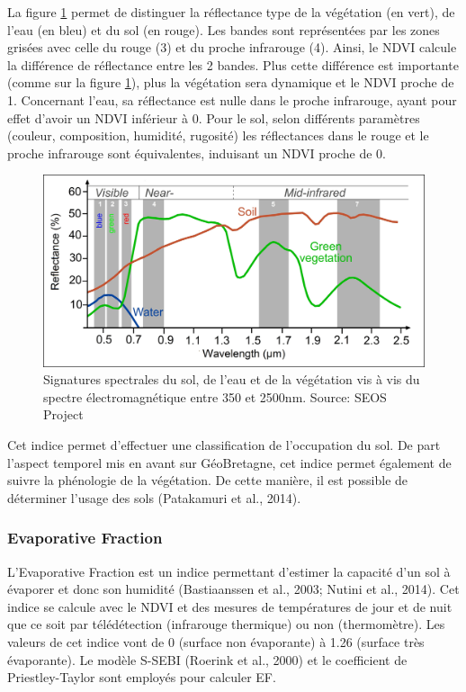 \documentclass[10pt,a4paper]{article}
\begin{document}
La figure \ref{signSpectr} permet de distinguer la réflectance type de la végétation (en vert), de l'eau (en bleu) et du sol (en rouge). Les bandes sont représentées par les zones grisées avec celle du rouge (3) et du proche infrarouge (4). Ainsi, le NDVI calcule la différence de réflectance entre les 2 bandes. Plus cette différence est importante (comme sur la figure \ref{signSpectr}), plus la végétation sera dynamique et le NDVI proche de 1. Concernant l'eau, sa réflectance est nulle dans le proche infrarouge, ayant pour effet d'avoir un NDVI inférieur à 0. Pour le sol, selon différents paramètres (couleur, composition, humidité, rugosité) les réflectances dans le rouge et le proche infrarouge sont équivalentes, induisant un NDVI proche de 0.\smallbreak

\begin{figure}[!h]
\centering
\includegraphics[scale=0.4]{img/spectral_signatures.jpg}
\caption{Signatures spectrales du sol, de l'eau et de la végétation vis à vis du spectre électromagnétique entre 350 et 2500nm. Source: SEOS Project}
\label{signSpectr}
\end{figure}

Cet indice permet d'effectuer une classification de l'occupation du sol. De part l'aspect temporel mis en avant sur GéoBretagne, cet indice permet également de suivre la phénologie de la végétation. De cette manière, il est possible de déterminer l'usage des sols (Patakamuri et al., 2014).

\subsubsection{Evaporative Fraction}

L'Evaporative Fraction est un indice permettant d'estimer la capacité d'un sol à évaporer et donc son humidité (Bastiaanssen et al., 2003; Nutini et al., 2014). Cet indice se calcule avec le NDVI et des mesures de températures de jour et de nuit que ce soit par télédétection (infrarouge thermique) ou non (thermomètre). Les valeurs de cet indice vont de 0 (surface non évaporante) à 1.26 (surface très évaporante). Le modèle S-SEBI (Roerink et al., 2000) et le coefficient de Priestley-Taylor sont employés pour calculer EF.\smallbreak
\end{document}
